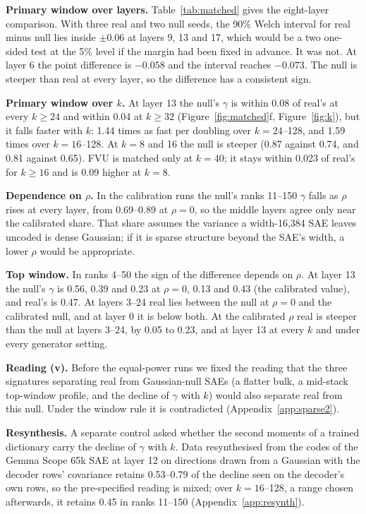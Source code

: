 \documentclass{article}
\begin{document}
\textbf{Primary window over layers.} Table~\ref{tab:matched} gives the eight-layer comparison. With three real and two null seeds, the 90\% Welch interval for real minus null lies inside $\pm 0.06$ at layers 9, 13 and 17, which would be a two one-sided test at the 5\% level if the margin had been fixed in advance. It was not. At layer 6 the point difference is $-0.058$ and the interval reaches $-0.073$. The null is steeper than real at every layer, so the difference has a consistent sign.

\textbf{Primary window over $k$.} At layer 13 the null's $\gamma$ is within 0.08 of real's at every $k\ge 24$ and within 0.04 at $k\ge 32$ (Figure~\ref{fig:matched}f, Figure~\ref{fig:k}), but it falls faster with $k$: 1.44 times as fast per doubling over $k=24$--128, and 1.59 times over $k=16$--128. At $k=8$ and 16 the null is steeper (0.87 against 0.74, and 0.81 against 0.65). FVU is matched only at $k=40$; it stays within 0.023 of real's for $k\ge 16$ and is 0.09 higher at $k=8$.

\textbf{Dependence on $\rho$.} In the calibration runs the null's ranks 11--150 $\gamma$ falls as $\rho$ rises at every layer, from 0.69--0.89 at $\rho=0$, so the middle layers agree only near the calibrated share. That share assumes the variance a width-16,384 SAE leaves uncoded is dense Gaussian; if it is sparse structure beyond the SAE's width, a lower $\rho$ would be appropriate.

\textbf{Top window.} In ranks 4--50 the sign of the difference depends on $\rho$. At layer 13 the null's $\gamma$ is 0.56, 0.39 and 0.23 at $\rho=0$, 0.13 and 0.43 (the calibrated value), and real's is 0.47. At layers 3--24 real lies between the null at $\rho=0$ and the calibrated null, and at layer 0 it is below both. At the calibrated $\rho$ real is steeper than the null at layers 3--24, by 0.05 to 0.23, and at layer 13 at every $k$ and under every generator setting.

\textbf{Reading (v).} Before the equal-power runs we fixed the reading that the three signatures separating real from Gaussian-null SAEs (a flatter bulk, a mid-stack top-window profile, and the decline of $\gamma$ with $k$) would also separate real from this null. Under the window rule it is contradicted (Appendix~\ref{app:sparse2}).

\textbf{Resynthesis.} A separate control asked whether the second moments of a trained dictionary carry the decline of $\gamma$ with $k$. Data resynthesised from the codes of the Gemma Scope 65k SAE at layer 12 on directions drawn from a Gaussian with the decoder rows' covariance retains 0.53--0.79 of the decline seen on the decoder's own rows, so the pre-specified reading is mixed; over $k=16$--128, a range chosen afterwards, it retains 0.45 in ranks 11--150 (Appendix~\ref{app:resynth}).
\end{document}
